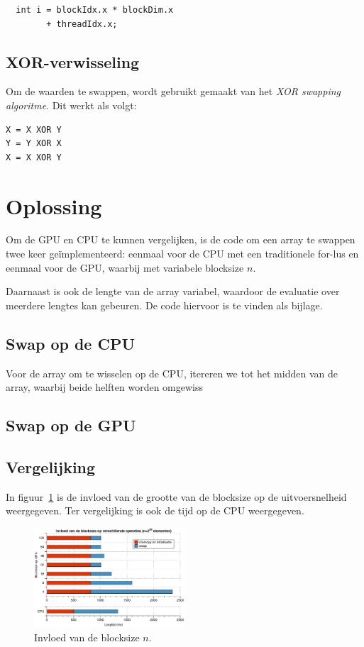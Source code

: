 \documentclass[10pt, twocolumn, a4paper]{article}
\begin{document}
\begin{verbatim}
  int i = blockIdx.x * blockDim.x 
		+ threadIdx.x;
\end{verbatim}

\subsection{XOR-verwisseling}
Om de waarden te swappen, wordt gebruikt gemaakt van het \emph{XOR swapping algoritme}. Dit werkt als volgt:

\begin{verbatim}
X = X XOR Y
Y = Y XOR X
X = X XOR Y
\end{verbatim}

\section{Oplossing}
Om de GPU en CPU te kunnen vergelijken, is de code om een array te swappen twee keer ge\"implementeerd: eenmaal voor de CPU met een traditionele for-lus en eenmaal voor de GPU, waarbij met variabele blocksize $n$.

Daarnaast is ook de lengte van de array variabel, waardoor de evaluatie over meerdere lengtes kan gebeuren. De code hiervoor is te vinden als bijlage.

\subsection{Swap op de CPU}
Voor de array om te wisselen op de CPU, itereren we tot het midden van de array, waarbij beide helften worden omgewiss
\subsection{Swap op de GPU}

\subsection{Vergelijking}
In figuur~\ref{blocksize} is de invloed van de grootte van de blocksize op de uitvoersnelheid weergegeven. Ter vergelijking is ook de tijd op de CPU weergegeven.

\begin{figure}
\centering
\includegraphics[width=0.5\textwidth]{blocksize.eps}
\caption{Invloed van de blocksize $n$.}
\label{blocksize}
\end{figure}
\end{document}
